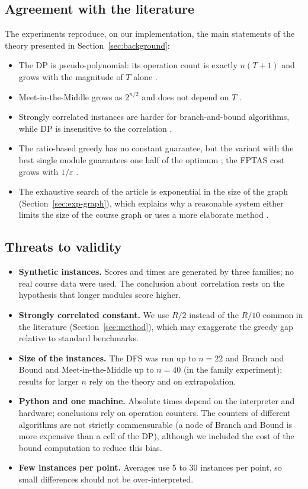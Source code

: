 \subsection{Agreement with the literature}

The experiments reproduce, on our implementation, the main statements of the theory presented in Section~\ref{sec:background}:
\begin{itemize}[leftmargin=1.4em,itemsep=2pt]
\item The DP is pseudo-polynomial: its operation count is exactly $n(T+1)$ and grows with the magnitude of $T$ alone \cite{garey1979,kellerer2004}.
\item Meet-in-the-Middle grows as $2^{n/2}$ and does not depend on $T$ \cite{horowitz1974}.
\item Strongly correlated instances are harder for branch-and-bound algorithms, while DP is insensitive to the correlation \cite{pisinger2005}.
\item The ratio-based greedy has no constant guarantee, but the variant with the best single module guarantees one half of the optimum \cite{kellerer2004}; the FPTAS cost grows with $1/\varepsilon$ \cite{ibarra1975,lawler1979}.
\item The exhaustive search of the article is exponential in the size of the graph (Section~\ref{sec:exp-graph}), which explains why a reasonable system either limits the size of the course graph or uses a more elaborate method \cite{nabizadeh2017rutico}.
\end{itemize}

\subsection{Threats to validity}

\begin{itemize}[leftmargin=1.4em,itemsep=2pt]
\item \textbf{Synthetic instances.} Scores and times are generated by three families; no real course data were used. The conclusion about correlation rests on the hypothesis that longer modules score higher.
\item \textbf{Strongly correlated constant.} We use $R/2$ instead of the $R/10$ common in the literature (Section~\ref{sec:method}), which may exaggerate the greedy gap relative to standard benchmarks.
\item \textbf{Size of the instances.} The DFS was run up to $n=22$ and Branch and Bound and Meet-in-the-Middle up to $n=40$ (in the family experiment); results for larger $n$ rely on the theory and on extrapolation.
\item \textbf{Python and one machine.} Absolute times depend on the interpreter and hardware; conclusions rely on operation counters. The counters of different algorithms are not strictly commensurable (a node of Branch and Bound is more expensive than a cell of the DP), although we included the cost of the bound computation to reduce this bias.
\item \textbf{Few instances per point.} Averages use 5 to 30 instances per point, so small differences should not be over-interpreted.
\end{itemize}
